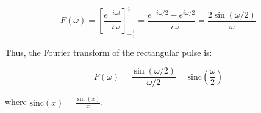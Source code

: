 \[ F(\omega) = \left[ \frac{e^{-i \omega t}}{-i \omega} \right]_{-\frac{1}{2}}^{\frac{1}{2}} = \frac{e^{-i \omega / 2} - e^{i \omega / 2}}{-i \omega} = \frac{2 \sin(\omega / 2)}{\omega} \]

Thus, the Fourier transform of the rectangular pulse is:

\[ F(\omega) = \frac{\sin(\omega / 2)}{\omega / 2} = \text{sinc}\left(\frac{\omega}{2}\right) \]

where \(\text{sinc}(x) = \frac{\sin(x)}{x}\).








